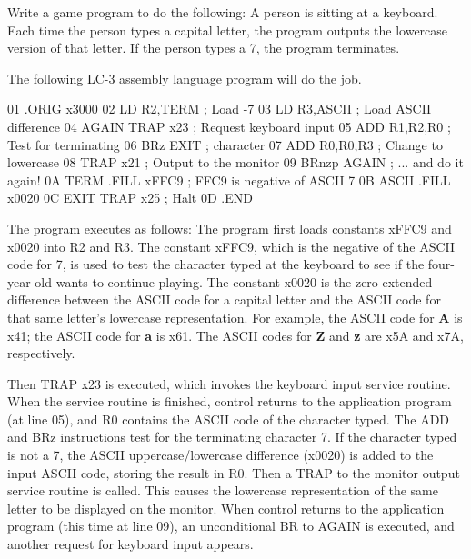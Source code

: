 \documentclass{patt}
\begin{document}
\begin{example}

  Write a game program to do the following: A person is sitting at a
  keyboard. Each time the person types a capital letter, the program
  outputs the lowercase version of that letter.  If the person types a
  7, the program terminates.

The following LC-3 assembly language program will do the
job.

\begin{minipage}{\textwidth}
\begin{colorverbatim}
01           .ORIG x3000
02           LD    R2,TERM  ; Load -7
03           LD    R3,ASCII ; Load ASCII difference
04    AGAIN  TRAP  x23      ; Request keyboard input
05           ADD   R1,R2,R0 ; Test for terminating
06           BRz   EXIT     ; character
07           ADD   R0,R0,R3 ; Change to lowercase
08           TRAP  x21      ; Output to the monitor
09           BRnzp AGAIN    ; ... and do it again!
0A    TERM   .FILL xFFC9    ; FFC9 is negative of ASCII 7
0B    ASCII  .FILL x0020
0C    EXIT   TRAP  x25      ; Halt
0D           .END
\end{colorverbatim}
\end{minipage}

The program executes as follows: The program first loads constants
xFFC9 and x0020 into R2 and R3.  The constant xFFC9, which is the
negative of the ASCII code for 7, is used to test the character
typed at the keyboard to see if the four-year-old wants to
continue playing. The constant x0020 is the zero-extended
difference between the ASCII code for a capital letter and the
ASCII code for that same letter's lowercase representation.  For
example, the ASCII code for {\bf A} is x41; the ASCII code for
{\bf a} is x61.  The ASCII codes for {\bf Z} and {\bf z} are x5A
and x7A, respectively.

Then TRAP x23 is executed, which invokes the keyboard input service
routine.  When the service routine is finished, control returns to the
application program (at line 05), and R0 contains the ASCII code of
the character typed.  The ADD and BRz instructions test for the
terminating character 7.  If the character typed is not a 7, the ASCII
uppercase/lowercase difference (x0020) is added to the input ASCII
code, storing the result in R0.  Then a TRAP to the monitor output
service routine is called.  This causes the lowercase representation
of the same letter to be displayed on the monitor.  When control
returns to the application program (this time at line 09), an
unconditional BR to AGAIN is executed, and another request for
keyboard input appears.
\end{example}
\end{document}
